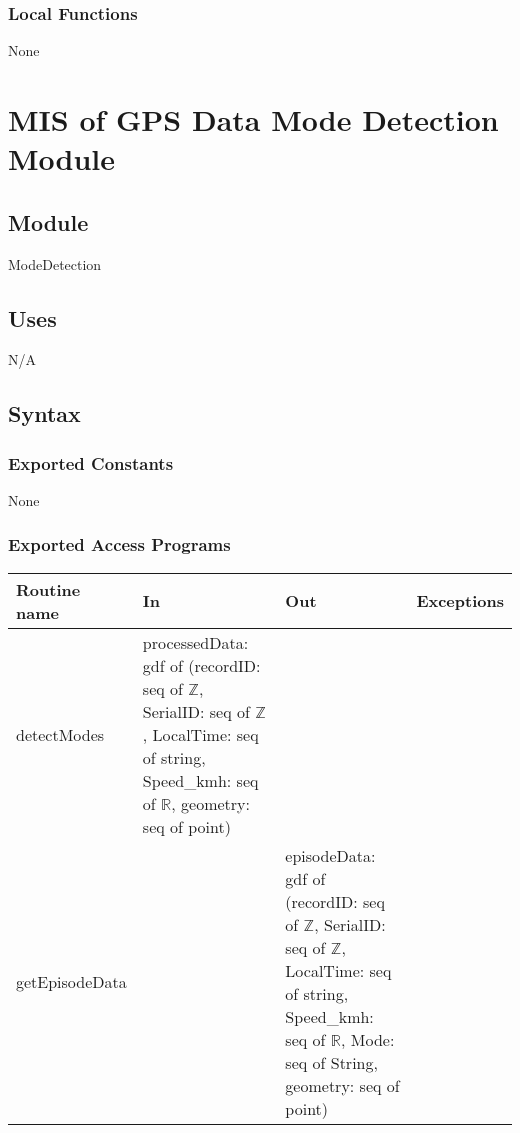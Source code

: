 \documentclass[12pt, titlepage]{article}
\begin{document}
\subsubsection{Local Functions}

None
\newpage

\section{MIS of GPS Data Mode Detection Module} \label{ModeDetection} 

\subsection{Module}

ModeDetection

\subsection{Uses}

N/A

\subsection{Syntax}

\subsubsection{Exported Constants}

None

\subsubsection{Exported Access Programs}

\begin{center}
\begin{tabular}{| l | >{\raggedright}p{4cm} | >{\raggedright}p{4cm} | l |}%
\hline
\textbf{Routine name} & \textbf{In} & \textbf{Out} & \textbf{Exceptions}\\
\hline
detectModes & processedData: gdf of (recordID: seq of $\mathbb{Z}$, SerialID: seq of $\mathbb{Z}$, LocalTime: seq of string, Speed\_kmh: seq of $\mathbb{R}$, geometry: seq of point) & & \\
\hline
getEpisodeData & & episodeData: gdf of (recordID: seq of $\mathbb{Z}$, SerialID: seq of $\mathbb{Z}$, LocalTime: seq of string, Speed\_kmh: seq of $\mathbb{R}$, Mode: seq of String, geometry: seq of point) & \\
\hline

\end{tabular}
\end{center}
\end{document}
